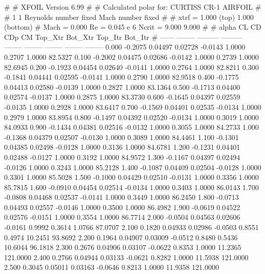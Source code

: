 #  
#       XFOIL         Version 6.99
#  
# Calculated polar for: CURTISS CR-1 AIRFOIL                            
#  
# 1 1 Reynolds number fixed          Mach number fixed         
#  
# xtrf =   1.000 (top)        1.000 (bottom)  
# Mach =   0.000     Re =     0.045 e 6     Ncrit =   9.000  9.000
#  
#   alpha    CL        CD       CDp       CM     Top_Xtr  Bot_Xtr  Top_Itr  Bot_Itr
#  ------ -------- --------- --------- -------- -------- -------- -------- --------
   0.000  -0.2075   0.04497   0.02728  -0.0143   1.0000   0.2707   1.0000  82.5327
   0.100  -0.2002   0.04475   0.02686  -0.0142   1.0000   0.2739   1.0000  82.6945
   0.200  -0.1923   0.04454   0.02640  -0.0141   1.0000   0.2764   1.0000  82.8211
   0.300  -0.1841   0.04441   0.02595  -0.0141   1.0000   0.2790   1.0000  82.9518
   0.400  -0.1775   0.04413   0.02580  -0.0139   1.0000   0.2827   1.0000  83.1364
   0.500  -0.1713   0.04400   0.02574  -0.0137   1.0000   0.2875   1.0000  83.3730
   0.600  -0.1645   0.04397   0.02559  -0.0135   1.0000   0.2928   1.0000  83.6417
   0.700  -0.1569   0.04401   0.02535  -0.0134   1.0000   0.2979   1.0000  83.8954
   0.800  -0.1497   0.04392   0.02520  -0.0134   1.0000   0.3019   1.0000  84.0933
   0.900  -0.1434   0.04381   0.02516  -0.0132   1.0000   0.3055   1.0000  84.2733
   1.000  -0.1368   0.04379   0.02507  -0.0130   1.0000   0.3089   1.0000  84.4461
   1.100  -0.1301   0.04385   0.02498  -0.0128   1.0000   0.3136   1.0000  84.6781
   1.200  -0.1231   0.04401   0.02488  -0.0127   1.0000   0.3192   1.0000  84.9572
   1.300  -0.1167   0.04397   0.02494  -0.0126   1.0000   0.3243   1.0000  85.2128
   1.400  -0.1087   0.04409   0.02504  -0.0128   1.0000   0.3301   1.0000  85.5028
   1.500  -0.1000   0.04429   0.02510  -0.0131   1.0000   0.3356   1.0000  85.7815
   1.600  -0.0910   0.04454   0.02514  -0.0134   1.0000   0.3403   1.0000  86.0143
   1.700  -0.0808   0.04468   0.02537  -0.0141   1.0000   0.3449   1.0000  86.2450
   1.800  -0.0713   0.04493   0.02557  -0.0146   1.0000   0.3500   1.0000  86.4982
   1.900  -0.0619   0.04522   0.02576  -0.0151   1.0000   0.3554   1.0000  86.7714
   2.000  -0.0504   0.04563   0.02606  -0.0161   0.9992   0.3614   1.0766  87.0707
   2.100   0.1820   0.04933   0.02986  -0.0503   0.8551   0.4974  10.2451  93.8692
   2.200   0.1964   0.04907   0.03009  -0.0512   0.8480   0.5436  10.6044  96.1818
   2.300   0.2676   0.04906   0.03107  -0.0622   0.8353   1.0000  11.2365 121.0000
   2.400   0.2766   0.04944   0.03133  -0.0621   0.8282   1.0000  11.5938 121.0000
   2.500   0.3045   0.05011   0.03163  -0.0646   0.8213   1.0000  11.9358 121.0000
